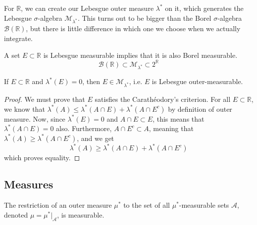   For $\mathbb{R}$, we can create our Lebesgue outer measure $\lambda^*$ on it, which generates the Lebesgue $\sigma$-algebra $\mathcal{M}_{\lambda^*}$. This turns out to be bigger than the Borel $\sigma$-algebra $\mathcal{B}(\mathbb{R})$, but there is little difference in which one we choose when we actually integrate. 

  \begin{theorem}
    A set $E \subset \mathbb{R}$ is Lebesgue measurable implies that it is also Borel measurable. 
    \begin{equation}
      \mathcal{B}(\mathbb{R}) \subset \mathcal{M}_{\lambda^*} \subset 2^\mathbb{R}
    \end{equation}
  \end{theorem}

  \begin{lemma}
    If $E \subset \mathbb{R}$ and $\lambda^*(E) = 0$, then $E \in \mathcal{M}_{\lambda^*}$, i.e. $E$ is Lebesgue outer-measurable. 
  \end{lemma}
  \begin{proof}
    We must prove that $E$ satisfies the Carathéodory's criterion. For all $E \subset \mathbb{R}$, we know that $\lambda^*(A) \leq \lambda^*(A \cap E) + \lambda^*(A \cap E^c)$ by definition of outer measure. Now, since $\lambda^* (E) =0$ and $A \cap E \subset E$, this means that $\lambda^* (A \cap E) = 0$ also. Furthermore, $A \cap E^c \subset A$, meaning that $\lambda^*(A) \geq \lambda^* (A \cap E^c)$, and we get 
    \begin{equation}
      \lambda^*(A) \geq \lambda^*(A \cap E) + \lambda^*(A \cap E^c)
    \end{equation}
    which proves equality. 
  \end{proof}

\subsection{Measures} 

  \begin{theorem}
    The restriction of an outer measure $\mu^\ast$ to the set of all $\mu^\ast$-measurable sets $\mathcal{A}$, denoted $\mu = \mu^\ast \big|_{\mathcal{A}}$, is measurable. 
  \end{theorem}

